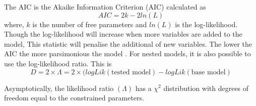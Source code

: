 \documentclass[12pt, a4paper, oneside]{article}\usepackage[]{graphicx}\usepackage[]{color}
\begin{document}
The AIC is the Akaike Information Criterion (AIC) calculated as 
\begin{equation}
AIC = 2k - 2ln(L) 
\end{equation}
where, $k$ is the number of free parameters and $ln(L)$ is the log-likelihood.  Though the log-likelihood will increase when more variables are added to the model, This statistic will penalise the additional of new variables.  The lower the AIC the more parsimonious the model \citet{AIC}. For nested models, it is also possible to use the log-likelihood ratio.  This is 
\begin{equation}
D = 2 \times \Lambda = 2 \times (logLik(\text{tested model}) - logLik(\text{base model})
\end{equation}

Asymptotically, the likelihood ratio $(\Lambda)$ has a $\chi^2$ distribution with degrees of freedom equal to the constrained parameters. 
\end{document}
